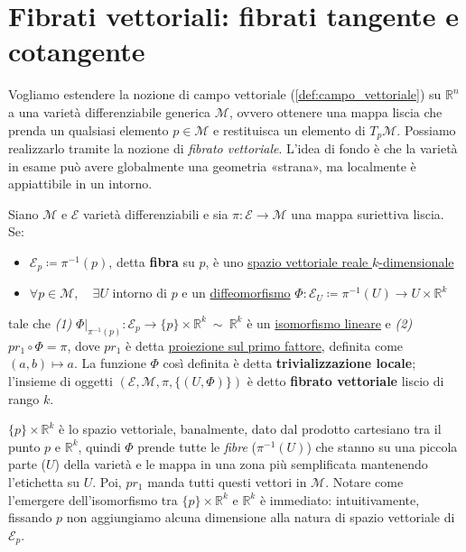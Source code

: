\section{Fibrati vettoriali: fibrati tangente e cotangente}
Vogliamo estendere la nozione di campo vettoriale (\ref{def:campo_vettoriale}) su $\mathbb{R}^n$ a una varietà differenziabile generica $\mathcal{M}$, ovvero ottenere una mappa liscia che prenda un qualsiasi elemento $p \in \mathcal{M}$ e restituisca un elemento di $T_p\mathcal{M}$. Possiamo realizzarlo tramite la nozione di \emph{fibrato vettoriale}. L'idea di fondo è che la varietà in esame può avere globalmente una geometria «strana», ma localmente è appiattibile in un intorno.
\begin{definition} %
    Siano $\mathcal{M}$ e $\mathcal{E}$ varietà differenziabili e sia $\pi : \mathcal{E} \rightarrow \mathcal{M}$ una mappa suriettiva liscia. Se:
    \begin{itemize}
        \item $\mathcal{E}_p \coloneqq \pi^{-1}(p)$, detta \textbf{fibra} su $p$, è uno \underline{spazio vettoriale reale $k$-dimensionale}
        \item $\forall p \in \mathcal{M}, \quad \exists U$ intorno di $p$ e un \underline{diffeomorfismo} $\Phi : \mathcal{E}_U \coloneqq \pi^{-1}(U) \rightarrow U \times \mathbb{R}^k$
    \end{itemize}
    tale che \emph{(1)} $\left.\Phi\right|_{\pi^{-1}(p)} : \mathcal{E}_p \rightarrow \{ p \} \times \mathbb{R}^k \ \sim \ \mathbb{R}^k$ è un \underline{isomorfismo lineare} e \emph{(2)} $pr_1 \circ \Phi = \pi$, dove $pr_1$ è detta \underline{proiezione sul primo fattore}, definita come $(a,b) \mapsto a$.
    La funzione $\Phi$ così definita è detta \textbf{trivializzazione locale}; l'insieme di oggetti $(\mathcal{E}, \mathcal{M}, \pi, \{ (U, \Phi)\})$ è detto \textbf{fibrato vettoriale} liscio di rango $k$.
\end{definition}
$\{ p \} \times \mathbb{R}^k$ è lo spazio vettoriale, banalmente, dato dal prodotto cartesiano tra il punto $p$ e $\mathbb{R}^k$, quindi $\Phi$ prende tutte le \emph{fibre} ($\pi^{-1}(U)$) che stanno su una piccola parte ($U$) della varietà e le mappa in una zona più semplificata mantenendo l'etichetta su $U$. Poi, $pr_1$ manda tutti questi vettori in $\mathcal{M}$.
Notare come l'emergere dell'isomorfismo tra $\{ p \} \times \mathbb{R}^k$ e $\mathbb{R}^k$ è immediato: intuitivamente, fissando $p$ non aggiungiamo alcuna dimensione alla natura di spazio vettoriale di $\mathcal{E}_p$.
